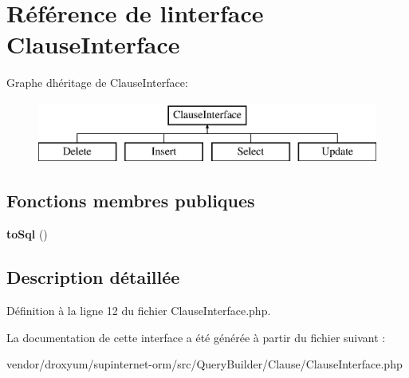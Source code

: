 \hypertarget{interface_o_r_m_1_1_query_builder_1_1_clause_1_1_clause_interface}{}\section{Référence de l\textquotesingle{}interface Clause\+Interface}
\label{interface_o_r_m_1_1_query_builder_1_1_clause_1_1_clause_interface}
Graphe d\textquotesingle{}héritage de Clause\+Interface\+:\begin{figure}[H]
\begin{center}
\leavevmode
\includegraphics[height=2.000000cm]{interface_o_r_m_1_1_query_builder_1_1_clause_1_1_clause_interface}
\end{center}
\end{figure}
\subsection*{Fonctions membres publiques}
\begin{DoxyCompactItemize}
\item 
{\bfseries to\+Sql} ()\hypertarget{interface_o_r_m_1_1_query_builder_1_1_clause_1_1_clause_interface_a63f8ba861f1ecabe359d454fde60d395}{}\label{interface_o_r_m_1_1_query_builder_1_1_clause_1_1_clause_interface_a63f8ba861f1ecabe359d454fde60d395}

\end{DoxyCompactItemize}


\subsection{Description détaillée}


Définition à la ligne 12 du fichier Clause\+Interface.\+php.



La documentation de cette interface a été générée à partir du fichier suivant \+:\begin{DoxyCompactItemize}
\item 
vendor/droxyum/supinternet-\/orm/src/\+Query\+Builder/\+Clause/Clause\+Interface.\+php\end{DoxyCompactItemize}
